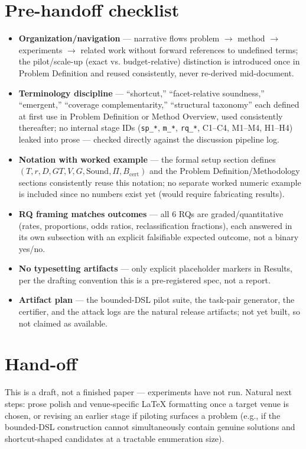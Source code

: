 \documentclass[11pt]{article}
\begin{document}
\section*{Pre-handoff checklist}
\begin{itemize}[leftmargin=1.4em]
\item \textbf{Organization/navigation} --- narrative flows problem $\to$ method $\to$ experiments $\to$ related work without forward references to undefined terms; the pilot/scale-up (exact vs. budget-relative) distinction is introduced once in Problem Definition and reused consistently, never re-derived mid-document.
\item \textbf{Terminology discipline} --- ``shortcut,'' ``facet-relative soundness,'' ``emergent,'' ``coverage complementarity,'' ``structural taxonomy'' each defined at first use in Problem Definition or Method Overview, used consistently thereafter; no internal stage IDs (\texttt{sp\_*}, \texttt{m\_*}, \texttt{rq\_*}, C1--C4, M1--M4, H1--H4) leaked into prose --- checked directly against the discussion pipeline log.
\item \textbf{Notation with worked example} --- the formal setup section defines $(T, r, D, GT, V, G, \mathrm{Sound}, \Pi, B_{\text{cert}})$ and the Problem Definition/Methodology sections consistently reuse this notation; no separate worked numeric example is included since no numbers exist yet (would require fabricating results).
\item \textbf{RQ framing matches outcomes} --- all 6 RQs are graded/quantitative (rates, proportions, odds ratios, reclassification fractions), each answered in its own subsection with an explicit falsifiable expected outcome, not a binary yes/no.
\item \textbf{No typesetting artifacts} --- only explicit placeholder markers in Results, per the drafting convention this is a pre-registered spec, not a report.
\item \textbf{Artifact plan} --- the bounded-DSL pilot suite, the task-pair generator, the certifier, and the attack logs are the natural release artifacts; not yet built, so not claimed as available.
\end{itemize}

\section*{Hand-off}
This is a draft, not a finished paper --- experiments have not run. Natural next steps: prose polish and venue-specific LaTeX formatting once a target venue is chosen, or revising an earlier stage if piloting surfaces a problem (e.g., if the bounded-DSL construction cannot simultaneously contain genuine solutions and shortcut-shaped candidates at a tractable enumeration size).



\end{document}
